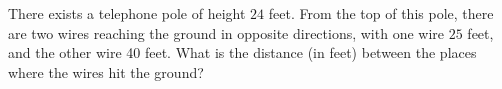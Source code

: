 There exists a telephone pole of height $24$ feet. From the top of this pole, there are two wires reaching the ground in opposite directions, with one wire $25$ feet, and the other wire 40 feet. What is the distance (in feet) between the places where the wires hit the ground?
